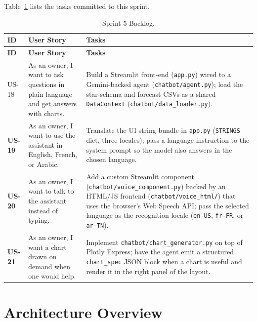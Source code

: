 Table~\ref{tab:sprint5_backlog} lists the tasks committed to this sprint.

\begin{longtable}{>{\bfseries}p{1.3cm} p{4.4cm} p{7cm}}
  \caption{Sprint 5 Backlog.\label{tab:sprint5_backlog}} \\
  \toprule
  \textbf{ID} & \textbf{User Story} & \textbf{Tasks} \\
  \midrule
  \endfirsthead
  \toprule
  \textbf{ID} & \textbf{User Story} & \textbf{Tasks} \\
  \midrule
  \endhead
  \bottomrule
  \endfoot

  US-18 & As an owner, I want to ask questions in plain language and get
          answers with charts.
        & Build a Streamlit front-end (\texttt{app.py}) wired to a Gemini-backed
          agent (\texttt{chatbot/agent.py}); load the star-schema and forecast
          CSVs as a shared \texttt{DataContext} (\texttt{chatbot/data\_loader.py}). \\[4pt]

  US-19 & As an owner, I want to use the assistant in English, French, or
          Arabic.
        & Translate the UI string bundle in \texttt{app.py} (\texttt{STRINGS}
          dict, three locales); pass a language instruction to the system
          prompt so the model also answers in the chosen language. \\[4pt]

  US-20 & As an owner, I want to talk to the assistant instead of typing.
        & Add a custom Streamlit component (\texttt{chatbot/voice\_component.py})
          backed by an HTML/JS frontend (\texttt{chatbot/voice\_html/}) that
          uses the browser's Web Speech API; pass the selected language as
          the recognition locale (\texttt{en-US}, \texttt{fr-FR}, or \texttt{ar-TN}). \\[4pt]

  US-21 & As an owner, I want a chart drawn on demand when one would help.
        & Implement \texttt{chatbot/chart\_generator.py} on top of Plotly
          Express; have the agent emit a structured \texttt{chart\_spec}
          JSON block when a chart is useful and render it in the right
          panel of the layout. \\
\end{longtable}

\section{Architecture Overview}


